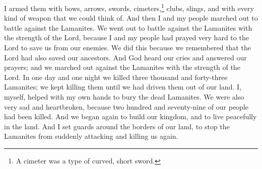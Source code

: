 I armed them with bows, arrows, swords, cimeters,\footnote{A cimeter was a type of curved, short sword.}%
clubs, slings, and with every kind of weapon that we could think of. And then I and my people marched out to battle against the Lamanites.
\bverse \iffalse Yea, in the strength of the Lord did we go forth to battle against the Lamanites; for I and my people did cry mightily to the Lord that he would deliver us out of the hands of our enemies, for we were awakened to a remembrance of the deliverance of our fathers. \fi
We went out to battle against the Lamanites with the strength of the Lord, because I and my people had prayed very hard to the Lord to save us from our enemies. We did this because we remembered that the Lord had also saved our ancestors.
\bverse \iffalse And God did hear our cries and did answer our prayers; and we did go forth in his might; yea, we did go forth against the Lamanites, and in one day and a night we did slay three thousand and forty-three; we did slay them even until we had driven them out of our land. \fi
And God heard our cries and answered our prayers; and we marched out against the Lamanites with the strength of the Lord. In one day and one night we killed three thousand and forty-three Lamanites; we kept killing them until we had driven them out of our land.
\bverse \iffalse And I, myself, with mine own hands, did help to bury their dead. And behold, to our great sorrow and lamentation, two hundred and seventy-nine of our brethren were slain. \fi
I, myself, helped with my own hands to bury the dead Lamanites. We were also very sad and heartbroken, because two hundred and seventy-nine of our people had been killed.
\bchapter
\bverse \iffalse And it came to pass that we again began to establish the kingdom and we again began to possess the land in peace. And I caused that there should be weapons of war made of every kind, that thereby I might have weapons for my people against the time the Lamanites should come up again to war against my people. \fi
And we began again to build our kingdom, and to live peacefully in the land. 
\bverse \iffalse And I set guards round about the land, that the Lamanites might not come upon us again unawares and destroy us; and thus I did guard my people and my flocks, and keep them from falling into the hands of our enemies. \fi
And I set guards around the borders of our land, to stop the Lamanites from suddenly attacking and killing us again.
